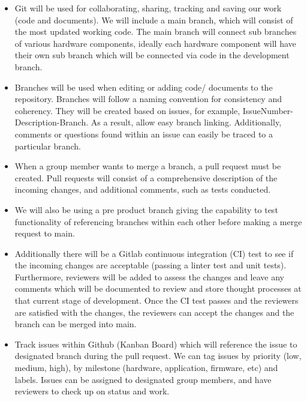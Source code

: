 \documentclass{article}
\begin{document}
\begin{itemize}
	\item Git will be used for collaborating, sharing, tracking and saving our work (code and documents). We will include a main branch, which will consist of the most updated working code. The main branch will connect sub branches of various hardware components, ideally each hardware component will have their own sub branch which will be connected via code in the development branch.
	
	\item Branches will be used when editing or adding code/ documents to the repository. Branches will follow a naming convention for consistency and coherency. They will be created based on issues, for example, IssueNumber-Description-Branch. As a result, allow easy branch linking. Additionally, comments or questions found within an issue can easily be traced to a particular branch. 
	
	\item When a group member wants to merge a branch, a pull request must be created. Pull requests will consist of a comprehensive description of the incoming changes, and additional comments, such as tests conducted. 
	
	\item We will also be using a pre product branch giving the capability to test functionality of referencing branches within each other before making a merge request to main.
	
	\item Additionally there will be a Gitlab continuous integration (CI) test to see if the incoming changes are acceptable (passing a linter test and unit tests). Furthermore, reviewers will be added to assess the changes and leave any comments which will be documented to review and store thought processes at that current stage of development. Once the CI test passes and the reviewers are satisfied with the changes, the reviewers can accept the changes and the branch can be merged into main. 
	
	\item Track issues within Github (Kanban Board) which will reference the issue to designated branch during the pull request. We can tag issues by priority (low, medium, high), by milestone (hardware, application, firmware, etc) and labels. Issues can be assigned to designated group members, and have reviewers to check up on status and work. 

\end{itemize}
\end{document}
